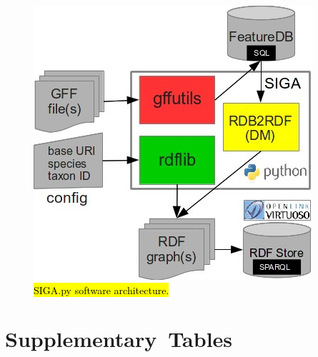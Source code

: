 \documentclass[applsci,article,accept,moreauthors,pdftex]{Definitions/mdpi}
\begin{document}
{%

\begin{figure}[H]
\centering
\includegraphics[scale=0.9]{FigureA1.jpg} %
\caption{\hl{SIGA.py software architecture.}} 
\label{FigureA1}
\end{figure} 

\section{Supplementary~Tables}
\vspace{-3mm}

}
\end{document}

